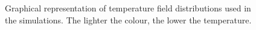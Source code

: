 \begin{figure}[t]
\begin{subfigure}[b]{0.2\textwidth}
      \caption{}
      \label{fig:non-convex}
  \end{subfigure}
  \caption{Graphical representation of temperature field distributions used in the simulations. 
  The lighter the colour, the lower the temperature. }
  \label{fig:field-phenomena-distribution}
\end{figure}